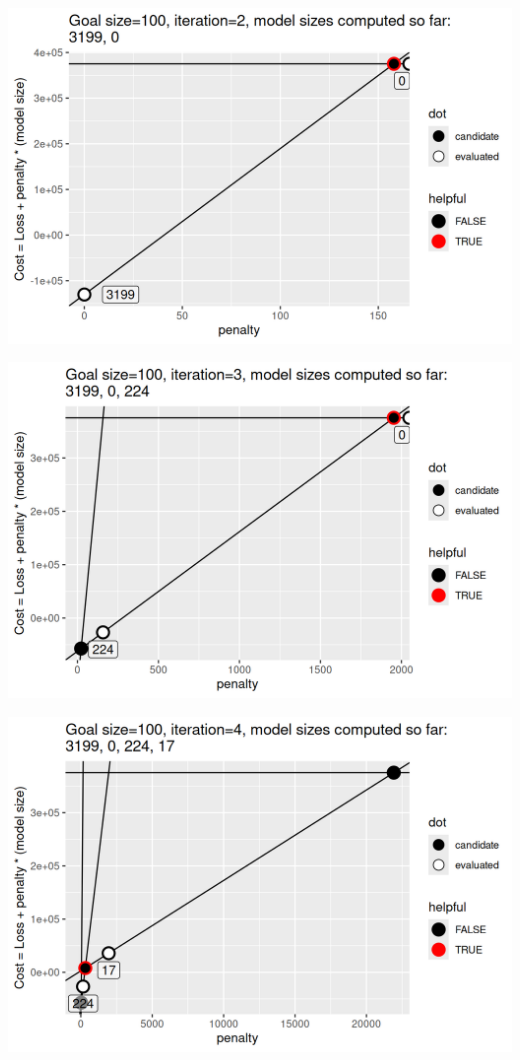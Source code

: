 
\begin{frame}
  \includegraphics[width=\textwidth]{figure-sequential-search-2.png}
\end{frame}
 
\begin{frame}
  \includegraphics[width=\textwidth]{figure-sequential-search-3.png}
\end{frame}
 
\begin{frame}
  \includegraphics[width=\textwidth]{figure-sequential-search-4.png}
\end{frame}
 
